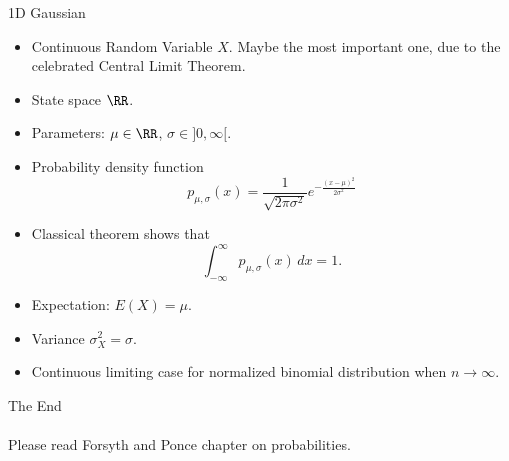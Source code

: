 \documentclass[9pt]{beamer}
\begin{document}
\begin{frame}[t]{1D Gaussian}
  \begin{itemize}
  \item Continuous Random Variable $X$. Maybe the most important one, due to the celebrated Central Limit Theorem.
  \item State space $\RR$.
  \item Parameters: $\mu\in \RR$, $\sigma\in ]0,\infty[$.
  \item Probability density function 
    $$
    p_{\mu,\sigma}(x) = \frac{1}{\sqrt{2\pi\sigma^2}}e^{-\frac{(x-\mu)^2}{2\sigma^2}}
    $$
  \item Classical theorem shows that
    $$
    \int_{-\infty}^\infty  p_{\mu,\sigma}(x)\,dx = 1.
    $$
  \item Expectation: $E(X) = \mu$.
  \item Variance $\sigma_X^2 = \sigma$.
  \item Continuous limiting case for normalized binomial distribution when $n\to\infty$. 
  \end{itemize}
\end{frame}



\begin{frame}
  \begin{center}
    {   \Huge The End}
    ~\\
    ~\\
{\large Please read Forsyth and Ponce chapter on probabilities.}
  \end{center}
\end{frame}




\end{document}
